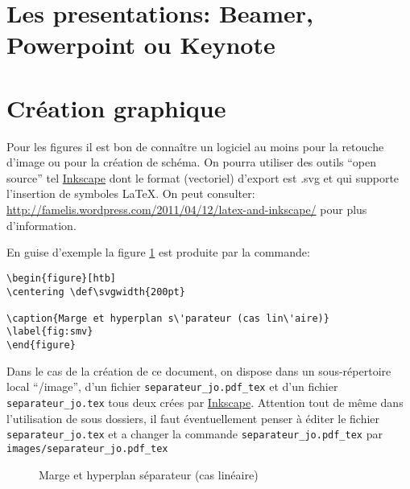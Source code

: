 
\section{Les presentations: Beamer, Powerpoint ou Keynote}


\section{Cr\'eation graphique}
Pour les figures il est bon de connaître un
logiciel au moins pour la retouche d'image ou pour la création de schéma.
On pourra utiliser des outils ``open source'' tel  \href{http://inkscape.org/}{Inkscape}
 dont le format (vectoriel)
d'export est .svg et qui supporte l'insertion de symboles \LaTeX. 
 On peut consulter: \url{http://famelis.wordpress.com/2011/04/12/latex-and-inkscape/}
pour plus d'information.

En guise d'exemple la figure \ref{fig:smv} est produite par la commande:
\begin{lstlisting}
\begin{figure}[htb] 
\centering \def\svgwidth{200pt} 
 
\caption{Marge et hyperplan s\'parateur (cas lin\'aire)} 
\label{fig:smv}
\end{figure}
\end{lstlisting}
Dans le cas de la création de ce document, on dispose dans un sous-répertoire local ``/image'',
d'un fichier \lstinline+separateur_jo.pdf_tex+ et d'un fichier \lstinline+separateur_jo.tex+
tous deux crées par \href{http://inkscape.org/}{Inkscape}.
Attention tout de m\^eme dans l'utilisation de sous dossiers,
il faut éventuellement penser \`a éditer le fichier
\lstinline+separateur_jo.tex+
et a changer la commande \lstinline+separateur_jo.pdf_tex+
par \lstinline+images/separateur_jo.pdf_tex+


\begin{figure}[htb] 
\centering \def\svgwidth{400pt} 
 
\caption{Marge et hyperplan séparateur (cas linéaire)} 
\label{fig:smv}
\end{figure}


